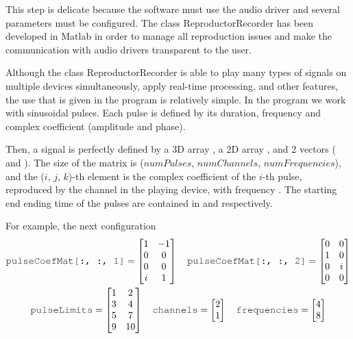 This step is delicate because the software must use the audio driver and several parameters must be configured. The class ReproductorRecorder has been developed in Matlab in order to manage all reproduction issues and make the communication with audio drivers transparent to the user.

Although the class ReproductorRecorder is able to play many types of signals on multiple devices simultaneously, apply real-time processing, and other features, the use that is given in the program is relatively simple. In the program we work with sinusoidal pulses. Each pulse is defined by its duration, frequency and complex coefficient (amplitude and phase).

Then, a signal is perfectly defined by a 3D array , a 2D array , and 2 vectors ( and ). The size of the matrix is ($numPulses$, $numChannels$, $numFrequencies$), and the ($i$, $j$, $k$)-th element is the complex coefficient of the $i$-th pulse, reproduced by the  channel in the playing device, with frequency . The starting end ending time of the pulses are contained in  and  respectively.

For example, the next configuration
\begin{gather*}
\text{\variable{pulseCoefMat[:, :, 1]}} = 
\begin{bmatrix}
	1 & -1 \\
	0 & 0 \\
	0 & 0 \\
	i & 1 \\
\end{bmatrix}
\quad
\text{\variable{pulseCoefMat[:, :, 2]}} = 
\begin{bmatrix}
	0 & 0 \\
	1 & 0 \\
	0 & i \\
	0 & 0 \\
\end{bmatrix}\\
\text{\variable{pulseLimits}} =
\begin{bmatrix}
	1 & 2 \\
	3 & 4 \\
	5 & 7 \\
	9 & 10 \\
\end{bmatrix}
\quad
\text{\variable{channels}} =
\begin{bmatrix}
	2 \\
	1 \\
\end{bmatrix}
\quad
\text{\variable{frequencies}} =
\begin{bmatrix}
	4 \\
	8 \\
\end{bmatrix}
\end{gather*}

